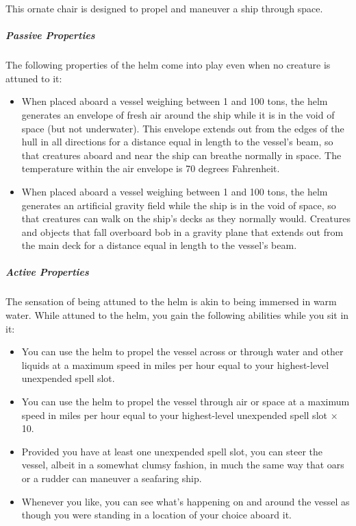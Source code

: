 \documentclass[10pt,a4paper,twoside,bg=print,twocolumn,openany,nodeprecatedcode]{dndbook}
\begin{document}
This ornate chair is designed to propel and maneuver a ship through space.

\subparagraph{Passive Properties}
The following properties of the helm come into play even when no creature is attuned to it:


\begin{itemize}
\item When placed aboard a vessel weighing between 1 and 100 tons, the helm generates an envelope of fresh air around the ship while it is in the void of space (but not underwater). This envelope extends out from the edges of the hull in all directions for a distance equal in length to the vessel's beam, so that creatures aboard and near the ship can breathe normally in space. The temperature within the air envelope is 70 degrees Fahrenheit.
\item When placed aboard a vessel weighing between 1 and 100 tons, the helm generates an artificial gravity field while the ship is in the void of space, so that creatures can walk on the ship's decks as they normally would. Creatures and objects that fall overboard bob in a gravity plane that extends out from the main deck for a distance equal in length to the vessel's beam.
\end{itemize}

\subparagraph{Active Properties}
The sensation of being attuned to the helm is akin to being immersed in warm water. While attuned to the helm, you gain the following abilities while you sit in it:


\begin{itemize}
\item You can use the helm to propel the vessel across or through water and other liquids at a maximum speed in miles per hour equal to your highest-level unexpended spell slot.
\item You can use the helm to propel the vessel through air or space at a maximum speed in miles per hour equal to your highest-level unexpended spell slot × 10.
\item Provided you have at least one unexpended spell slot, you can steer the vessel, albeit in a somewhat clumsy fashion, in much the same way that oars or a rudder can maneuver a seafaring ship.
\item Whenever you like, you can see what's happening on and around the vessel as though you were standing in a location of your choice aboard it.
\end{itemize}
\end{document}
